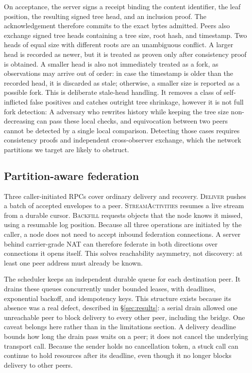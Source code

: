 \documentclass[conference,a4paper]{IEEEtran}
\begin{document}
On acceptance, the server signs a receipt binding the content identifier, the
leaf position, the resulting signed tree head, and an inclusion proof. The
acknowledgement therefore commits to the exact bytes admitted. Peers also exchange signed tree heads containing
a tree size, root hash, and timestamp. Two heads of equal size with different
roots are an unambiguous conflict. A larger head is recorded as newer, but it
is  treated as proven only after consistency proof is obtained. A smaller
head is also not immediately treated as a fork, as observations may arrive out
of order: in case the timestamp is older than the recorded head, it is discarded as
stale; otherwise, a smaller size is reported as a possible fork. This is
deliberate stale-head handling. It removes a class of self-inflicted false
positives and catches outright tree shrinkage, however it is not full fork
detection: A adversary who rewrites history while keeping the tree size
non-decreasing can pass these local checks, and equivocation between two peers
cannot be detected by a single local comparison. Detecting those cases requires
consistency proofs and independent cross-observer exchange, which the network
partitions we target are likely to obstruct.

\subsection{Partition-aware federation}

Three caller-initiated RPCs cover ordinary delivery and recovery.
\textsc{Deliver} pushes a batch of accepted envelopes to a peer.
\textsc{StreamActivities} resumes a live stream from a durable cursor.
\textsc{Backfill} requests objects that the node knows it missed, using a
resumable log position. Because all three operations are initiated by the
caller, a node does not need to accept inbound federation connections. A
server behind carrier-grade NAT can therefore federate in both directions
over connections it opens itself. This solves reachability asymmetry, not
discovery: at least one peer address must already be known.

The scheduler keeps an independent durable queue for each destination peer.
It drains these queues concurrently under bounded leases, with deadlines,
exponential backoff, and idempotency keys. This structure exists because its
absence was a real defect, described in \S\ref{sec:results}: a serial drain
allowed one unreachable peer to block delivery to every other peer, including
the bridge. One caveat belongs here rather than in the limitations section. A
delivery deadline bounds how long the drain pass waits on a peer; it does not
cancel the underlying transport call. Because the sender holds no cancellation
token, a stuck call can continue to hold resources after its deadline, even
though it no longer blocks delivery to other peers.
\end{document}
